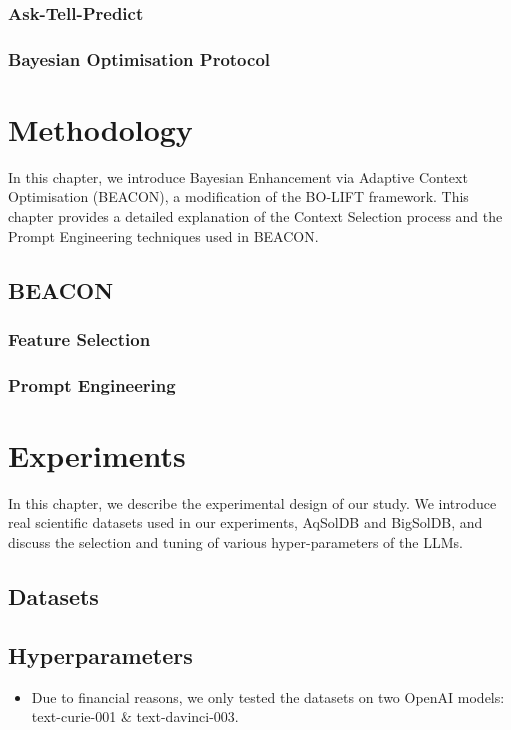 \documentclass{report}
\begin{document}
\subsection{Ask-Tell-Predict}
\subsection{Bayesian Optimisation Protocol}
\chapter{Methodology}
In this chapter, we introduce Bayesian Enhancement via Adaptive Context Optimisation (BEACON), a modification of the BO-LIFT framework. This chapter provides a detailed explanation of the Context Selection process and the Prompt Engineering techniques used in BEACON.
\section{BEACON}
\subsection{Feature Selection}
\subsection{Prompt Engineering}
\chapter{Experiments}
In this chapter, we describe the experimental design of our study. We introduce real scientific datasets used in our experiments, AqSolDB and BigSolDB, and discuss the selection and tuning of various hyper-parameters of the LLMs.
\section{Datasets}
\section{Hyperparameters}
\begin{itemize}
	\item Due to financial reasons, we only tested the datasets on two OpenAI models: text-curie-001 \& text-davinci-003. 
\end{itemize}
\end{document}
